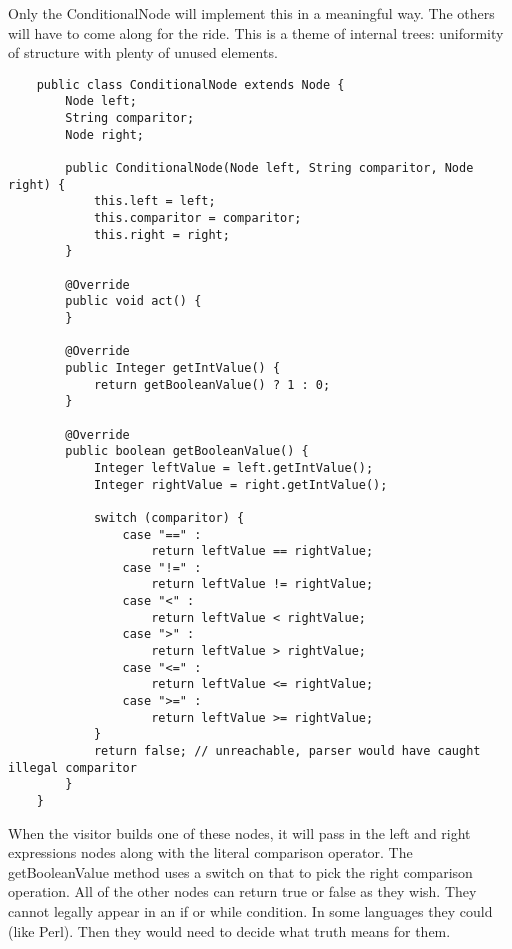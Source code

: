 Only the ConditionalNode will implement this in a meaningful way. The others
will have to come along for the ride. This is a theme of internal trees: uniformity
of structure with plenty of unused elements.

{\footnotesize
\begin{verbatim}
    public class ConditionalNode extends Node {
        Node left;
        String comparitor;
        Node right;
    
        public ConditionalNode(Node left, String comparitor, Node right) {
            this.left = left;
            this.comparitor = comparitor;
            this.right = right;
        }
    
        @Override
        public void act() {
        }
    
        @Override
        public Integer getIntValue() {
            return getBooleanValue() ? 1 : 0;
        }
    
        @Override
        public boolean getBooleanValue() {
            Integer leftValue = left.getIntValue();
            Integer rightValue = right.getIntValue();
    
            switch (comparitor) {
                case "==" :
                    return leftValue == rightValue;
                case "!=" :
                    return leftValue != rightValue;
                case "<" :
                    return leftValue < rightValue;
                case ">" :
                    return leftValue > rightValue;
                case "<=" :
                    return leftValue <= rightValue;
                case ">=" :
                    return leftValue >= rightValue;
            }
            return false; // unreachable, parser would have caught illegal comparitor
        }
    }
\end{verbatim}
}

When the visitor builds one of these nodes, it will pass in the left and right
expressions nodes along with the literal comparison operator. The getBooleanValue
method uses a switch on that to pick the right comparison operation.
All of the other nodes can return true or false as they wish. They cannot
legally appear in an if or while condition. In some languages they could (like Perl).
Then they would need to decide what truth means for them.

